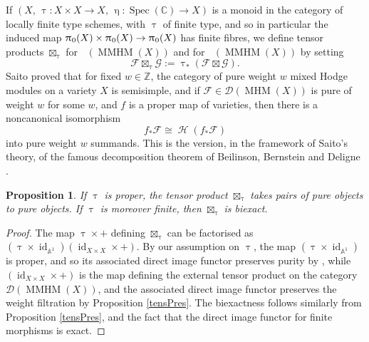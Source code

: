 \documentclass[a4paper,10pt]{amsart}
\newtheorem{proposition}[theorem]{Proposition}
\renewcommand{\pi}{\uppi\hspace{0.05em}}
\renewcommand{\tau}{\uptau}
\renewcommand{\eta}{\upeta}
\DeclareMathOperator{\MMHM}{MMHM}
\DeclareMathOperator{\MHM}{MHM}
\DeclareMathOperator{\Spec}{Spec}
\DeclareMathOperator{\id}{id}
\DeclareMathOperator{\Ho}{\mathcal{H}}
\DeclareMathOperator{\Dulf}{\mathcal{D}^{\geq, lf}}
\DeclareMathOperator{\Dllf}{\mathcal{D}^{\leq, lf}}
\newcommand{\Dub}{\mathcal{D}}
\begin{document}
If $(X,\,\tau\colon X\times X\rightarrow X,\,\eta\colon\Spec(\mathbb{C})\rightarrow X)$ is a monoid in the category of locally finite type schemes, with $\tau$ of finite type, and so in particular the induced map $\pi_0(X)\times\pi_0(X)\rightarrow \pi_0(X)$ has finite fibres, we define tensor products $\boxtimes_{\tau}$ for $\Dulf(\MMHM(X))$ and for $\Dllf(\MMHM(X))$ by setting 
\begin{equation}
\mathcal{F}\boxtimes_{\tau}\mathcal{G}:=\tau_*\left(\mathcal{F}\boxtimes\mathcal{G}\right).
\end{equation}
Saito proved \cite[(4.5.3),(4.5.4)]{Sai90} that for fixed $w\in\mathbb{Z}$, the category of pure weight $w$ mixed Hodge modules on a variety $X$ is semisimple, and if $\mathcal{F}\in\Dub(\MHM(X))$ is pure of weight $w$ for some $w$, and $f$ is a proper map of varieties, then there is a noncanonical isomorphism
\[
f_*\mathcal{F}\cong \Ho(f_*\mathcal{F})
\]
into pure weight $w$ summands.  This is the version, in the framework of Saito's theory, of the famous decomposition theorem of Beilinson, Bernstein and Deligne \cite{BBD}.  
\begin{proposition}
\label{weightPreserve}
If $\tau$ is proper, the tensor product $\boxtimes_{\tau}$ takes pairs of pure objects to pure objects.  If $\tau$ is moreover finite, then $\boxtimes_{\tau}$ is biexact.
\end{proposition}
\begin{proof}
The map $\tau\times +$ defining $\boxtimes_{\tau}$ can be factorised as $(\tau\times\id_{\mathbb{A}^1})(\id_{X\times X}\times +)$.  By our assumption on $\tau$, the map $(\tau\times \id_{\mathbb{A}^1})$ is proper, and so its associated direct image functor preserves purity by \cite[(4.5.2), (4.5.4)]{Sai90}, while $(\id_{X\times X}\times +)$ is the map defining the external tensor product on the category $\Dub(\MMHM(X))$, and the associated direct image functor preserves the weight filtration by Proposition \ref{tensPres}.  The biexactness follows similarly from Proposition \ref{tensPres}, and the fact that the direct image functor for finite morphisms is exact.
\end{proof}
\end{document}
